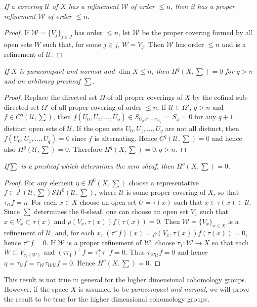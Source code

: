 \textit{If a covering $\mathscr{U}$ of  $X$ has a
  refinement $\mathscr{W}$ of order $\leq n$, 
  then it has a proper refinement $\mathscr{W}$ of order
$\leq n$.} 

\begin{proof}
If $\mathscr{W}= \{ V_j \}_{j \in J}$ has order $\leq n$, let
$\mathscr{W}$ be the proper covering formed by all open sets $W$ such
that, for some $j \in j$, $W=V_j$. Then $\mathscr{W}$ has order $\leq n$
and is a refinement of $\mathscr{U}$. 
\end{proof}

\textit{If $X$ is paracompact and normal and $\dim X \leq n$, then
  $H^q (X, \sum)=0$ for $q > n$ and an arbitrary presheaf $\sum$.} 

\begin{proof}
Replace the directed set $\Omega$ of all proper coverings of $X$ by
the cofinal sub-directed set $\Omega'$ of all proper covering of order
$\leq n$. If $\mathscr{U} \in \Omega'$, $q > n$ and $f \in C^q
(\mathscr{U}, \sum)$, then $f(U_0, U_1, \ldots ,U_q)\in S_{U_o \cap
\cdots \cap_{U_q}} = S_\phi = 0$ for any $q+1$ distinct open sets of
$\mathscr{U}$. If the open sets $U_0,U_1, \ldots ,U_q$ are not all
distinct, then $f(U_0,U_1, \ldots ,U_q)=0$ since $f$ is
alternating. Hence $C^q(\mathscr{U}, \sum)=0$ and hence also $H^q
(\mathscr{U}, \sum)=0$. Therefore $H^q(X, \sum)=0,q >n$. 
\end{proof}

\textit{If\pageoriginale $\sum$ is a presheaf which determines the
  zero sheaf, then $H^o(X, \sum)=0$.}  

\begin{proof}
For any element $\eta \in H^0 (X, \sum)$ choose a representative
\break $f
\in z^0 (\mathscr{U},\sum) \mathcal{S} H^0 (\mathscr{U},\sum)$, where
$\mathscr{U}$ is some proper covering of $X$, so that $\tau
_\mathscr{U} f =\eta$. For each $x \in X$ choose an open set $U=\tau
(x)$ such that $x \in \tau (x)\in \mathscr{U}$. Since $\sum$
determines the 0-sheaf, one can choose an open set $V_x$ such that
$x \in V_x \subset \tau (x)$ and $\rho (V_x, \tau (x))f (\tau
(x))=0$. Then $\mathscr{W} = \big\{ V_x \big\}_{x \in X}$ is a refinement of
$\mathscr{U}$, and, for each $x$, $(\tau ^+ f)(x)=\rho (V_x, \tau
(x))f(\tau (x))=0$, hence $\tau^+ f=0$. If $\mathscr{W}$ is a proper
refinement of $\mathscr{W}$, choose $\tau_1: \mathscr{W} \to X$ so
that each $W \subset V_{\tau _1(W)}$ and $(\tau \tau_1)^+f=\tau _1^+ \tau^+
f=0$. Thus $\tau _{\mathscr{W}\mathscr{U}}f=0$ and hence $\eta =\tau
_\mathscr{U} f=\tau_\mathscr{W}
\tau_{\mathscr{W}\mathscr{U}}f=0$. Hence $H^o (X, \sum)=0$.  
\end{proof}

This result is not true in general for the higher dimensional
cohomology groups. However, if the space $X$ is assumed to be \textit{
  paracompact and normal}, we will prove the result to be true for the
higher dimensional cohomology groups. 

